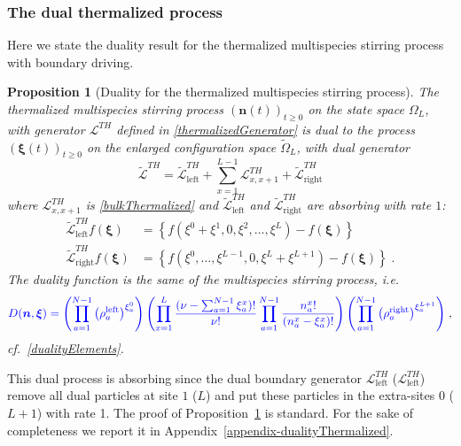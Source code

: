 \documentclass[10pt]{article}
\numberwithin{equation}{section}
\numberwithin{equation}{subsection}
\newtheorem{proposition}{Proposition}
\newcommand{\co}{\;,}
\newcommand{\dt}{\;.}
\newcommand{\fra}[1]{\textcolor[rgb]{0,0,1}{#1}}
\begin{document}
{\subsubsection{The dual thermalized process}\label{subsection-dualTHM}
Here we state the duality result for the thermalized multispecies stirring process with boundary driving.
\begin{proposition}[Duality for the thermalized multispecies stirring process]\label{proposition-dualityTHM}
The thermalized multispecies stirring process $(\bm{n}(t))_{t\geq 0}$ on the state space $\Omega_{L}$, with generator $\mathcal{L}^{TH}$ defined in \eqref{thermalizedGenerator} is dual to the process $(\bm{\xi}(t))_{t\geq 0}$ on the enlarged configuration space $\widetilde{\Omega}_{L}$, with dual generator
\begin{equation}
	\widetilde{\mathcal{L}}^{TH}=\widetilde{\mathcal{L}}_{\text{left}}^{TH}+\sum_{x=1}^{L-1}\mathcal{L}_{x,x+1}^{TH}+\widetilde{\mathcal{L}}_{\text{right}}^{TH}
\end{equation}
where $\mathcal{L}^{TH}_{x,x+1}$ is \eqref{bulkThermalized} and $\widetilde{\mathcal{L}}_{\text{left}}^{TH}$ and $\widetilde{\mathcal{L}}_{\text{right}}^{TH}$ are absorbing with rate $1$:
\begin{align}
	\widetilde{\mathcal{L}}_{\text{left}}^{TH}f(\bm{\xi})&=\left\{f(\xi^{0}+\xi^{1},0,\xi^{2},\ldots,\xi^{L})-f(\bm{\xi})\right\}\nonumber\\ \widetilde{\mathcal{L}}_{\text{right}}^{TH}f(\bm{\xi})&=\left\{f(\xi^{0},\ldots,\xi^{L-1},0,\xi^{L}+\xi^{L+1})-f(\bm{\xi})\right\}\dt
\end{align}
The duality function is the same of the multispecies stirring process, i.e. 
\begin{equation}
	\fra{D(\bm{n},\bm{\xi})=\left(\prod_{a=1}^{N-1}\left(\rho_{a}^{\text{left}}\right)^{\xi_{a}^{0}}\right)\left(\prod_{x=1}^{L}\frac{(\nu-\sum_{a=1}^{N-1}\xi_{a}^{x})!}{\nu!}\prod_{a=1}^{N-1}\frac{n_{a}^{x}!}{(n_{a}^{x}-\xi_{a}^{x})!}\right)\left(\prod_{a=1}^{N-1}\left(\rho_{a}^{\text{right}}\right)^{\xi_{a}^{L+1}}\right)}\co
\end{equation}
cf.~\eqref{dualityElements}.
\end{proposition}
This dual process is absorbing since the dual boundary generator $\mathcal{L}_{\text{left}}^{TH}$ ($\mathcal{L}_{\text{left}}^{TH}$) remove all dual particles at site $1$ ($L$) and put these particles in the extra-sites $0$ ($L+1$) with rate 1.
The proof of Proposition~\ref{proposition-dualityTHM} is standard. For the sake of completeness we report it in Appendix~\ref{appendix-dualityThermalized}.
}
\end{document}
